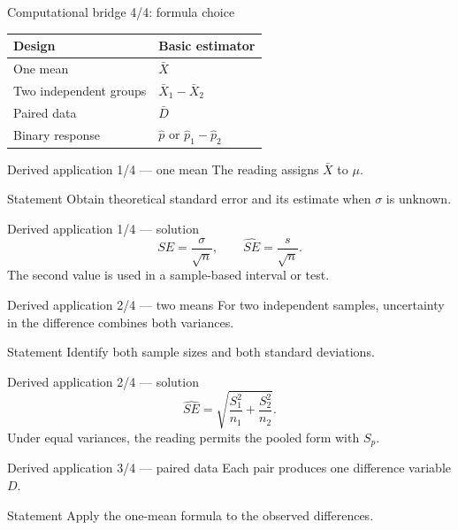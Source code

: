 \documentclass[10pt,aspectratio=169]{beamer}
\begin{document}
\begin{frame}{Computational bridge 4/4: formula choice}
  \footnotesize
  \begin{tabular}{ll}
    \hline
    Design & Basic estimator \\
    \hline
    One mean & $\bar X$ \\
    Two independent groups & $\bar X_1-\bar X_2$ \\
    Paired data & $\bar D$ \\
    Binary response & $\hat p$ or $\hat p_1-\hat p_2$ \\
    \hline
  \end{tabular}
\end{frame}

\begin{frame}{Derived application 1/4 --- one mean}
  \footnotesize
  The reading assigns $\bar X$ to $\mu$.
  \begin{block}{Statement}
    Obtain theoretical standard error and its estimate when $\sigma$ is unknown.
  \end{block}
\end{frame}

\begin{frame}{Derived application 1/4 --- solution}
  \footnotesize
  \[
    SE=\frac{\sigma}{\sqrt n},\qquad \widehat{SE}=\frac{s}{\sqrt n}.
  \]
  The second value is used in a sample-based interval or test.
\end{frame}

\begin{frame}{Derived application 2/4 --- two means}
  \footnotesize
  For two independent samples, uncertainty in the difference combines both
  variances.
  \begin{block}{Statement}
    Identify both sample sizes and both standard deviations.
  \end{block}
\end{frame}

\begin{frame}{Derived application 2/4 --- solution}
  \footnotesize
  \[
    \widehat{SE}=\sqrt{\frac{S_1^2}{n_1}+\frac{S_2^2}{n_2}}.
  \]
  Under equal variances, the reading permits the pooled form with $S_p$.
\end{frame}

\begin{frame}{Derived application 3/4 --- paired data}
  \footnotesize
  Each pair produces one difference variable $D$.
  \begin{block}{Statement}
    Apply the one-mean formula to the observed differences.
  \end{block}
\end{frame}
\end{document}
